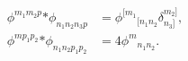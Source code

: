 \begin{equation}
\begin{aligned}
   \phi^{m_1m_2p} {*\phi}_{n_1n_2n_3p}
      &= \phi^{[m_1}{}_{[n_1n_2}\delta^{m_2]}_{n_3]} , \\
   \phi^{mp_1p_2} {*\phi}_{n_1n_2p_1p_2} &= 4\phi^{m}{}_{n_1n_2} .
\end{aligned}
\end{equation}

